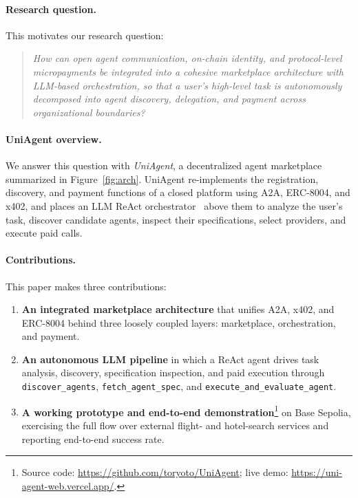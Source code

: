 \documentclass[sigconf]{acmart}
\begin{document}
\paragraph{Research question.}
This motivates our research question:
\begin{quote}
\itshape How can open agent communication, on-chain identity, and
protocol-level micropayments be integrated into a cohesive marketplace
architecture with LLM-based orchestration, so that a user's high-level
task is autonomously decomposed into agent discovery, delegation, and
payment across organizational boundaries?
\end{quote}

\paragraph{UniAgent overview.}
We answer this question with \emph{UniAgent}, a decentralized agent
marketplace summarized in Figure~\ref{fig:arch}. UniAgent re-implements
the registration, discovery, and payment functions of a closed platform
using A2A, ERC-8004, and x402, and places an LLM ReAct
orchestrator~\cite{yao2023react} above them to analyze the user's task,
discover candidate agents, inspect their specifications, select
providers, and execute paid calls.

\paragraph{Contributions.}
This paper makes three contributions:
\begin{enumerate}
  \item \textbf{An integrated marketplace architecture} that unifies
    A2A, x402, and ERC-8004 behind three loosely coupled layers:
    marketplace, orchestration, and payment.
  \item \textbf{An autonomous LLM pipeline} in which a ReAct agent
    drives task analysis, discovery, specification inspection, and paid
    execution through \texttt{discover\_agents},
    \texttt{fetch\_agent\_spec}, and
    \texttt{execute\_and\_evaluate\_agent}.
  \item \textbf{A working prototype and end-to-end
    demonstration}\footnote{Source code:
    \url{https://github.com/toryoto/UniAgent}; live demo:
    \url{https://uni-agent-web.vercel.app/}.} on Base Sepolia,
    exercising the full flow over external flight- and hotel-search
    services and reporting end-to-end success rate.
\end{enumerate}
\end{document}
